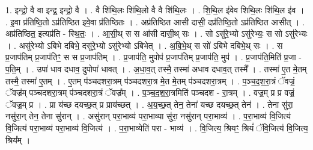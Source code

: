 \documentclass[17pt]{extarticle}
\begin{document}
1. इन्द्रो॒ वै वा इन्द्र॒ इन्द्रो॒ वै । . वै शि॑थि॒लः शि॑थि॒लो वै वै शि॑थि॒लः । . शि॒थि॒ल इ॑वेव शिथि॒लः शि॑थि॒ल इ॑व । . इ॒वा प्र॑तिष्ठि॒तो ऽप्र॑तिष्ठित इवे॒वा प्र॑तिष्ठितः । . अप्र॑तिष्ठित आसी दासी॒ दप्र॑तिष्ठि॒तो ऽप्र॑तिष्ठित आसीत् । . अप्र॑तिष्ठित॒ इत्यप्र॑ति - स्थि॒तः॒ । . आ॒सी॒थ् स स आ॑सी दासी॒थ् सः । . सो ऽसु॑रे॒भ्यो ऽसु॑रेभ्यः॒ स सो ऽसु॑रेभ्यः । . असु॑रेभ्यो ऽबिभे दबिभे॒ दसु॑रे॒भ्यो ऽसु॑रेभ्यो ऽबिभेत् । . अ॒बि॒भे॒थ् स सो॑ ऽबिभे दबिभे॒थ् सः । . स प्र॒जाप॑तिम् प्र॒जाप॑तिꣳ॒॒ स स प्र॒जाप॑तिम् । . प्र॒जाप॑ति॒ मुपोप॑ प्र॒जाप॑तिम् प्र॒जाप॑ति॒ मुप॑ । . प्र॒जाप॑ति॒मिति॑ प्र॒जा - प॒ति॒म् । . उपा॑ धाव दधाव॒ दुपोपा॑ धावत् । . अ॒धा॒व॒त् तस्मै॒ तस्मा॑ अधाव दधाव॒त् तस्मै᳚ । . तस्मा॑ ए॒त मे॒तम् तस्मै॒ तस्मा॑ ए॒तम् । . ए॒तम् प॑ञ्चदशरा॒त्रम् प॑ञ्चदशरा॒त्र मे॒त मे॒तम् प॑ञ्चदशरा॒त्रम् । . प॒ञ्च॒द॒श॒रा॒त्रं ॅवज्रं॒ ॅवज्र॑म् पञ्चदशरा॒त्रम् प॑ञ्चदशरा॒त्रं ॅवज्र᳚म् । . प॒ञ्च॒द॒श॒रा॒त्रमिति॑ पञ्चदश - रा॒त्रम् । . वज्र॒म् प्र प्र वज्रं॒ ॅवज्र॒म् प्र । . प्रा य॑च्छ दयच्छ॒त् प्र प्राय॑च्छत् । . अ॒य॒च्छ॒त् तेन॒ तेना॑ यच्छ दयच्छ॒त् तेन॑ । . तेना सु॑रा॒ नसु॑रा॒न् तेन॒ तेना सु॑रान् । . असु॑रान् परा॒भाव्य॑ परा॒भाव्या सु॑रा॒ नसु॑रान् परा॒भाव्य॑ । . प॒रा॒भाव्य॑ वि॒जित्य॑ वि॒जित्य॑ परा॒भाव्य॑ परा॒भाव्य॑ वि॒जित्य॑ । . प॒रा॒भाव्येति॑ परा - भाव्य॑ । . वि॒जित्य॒ श्रियꣳ॒॒ श्रियं॑ ॅवि॒जित्य॑ वि॒जित्य॒ श्रिय᳚म् । \newline
\end{document}

